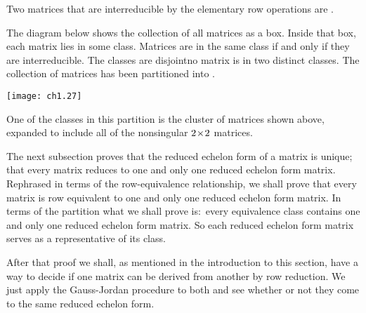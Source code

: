 \begin{definition}
Two matrices that are interreducible by the elementary row operations
are .%
\end{definition}

The diagram below shows the collection of all matrices as a box.
Inside that box, each matrix lies in some class.
Matrices are in the same class if and only if they are interreducible.
The classes are disjoint\Dash no matrix is in two distinct classes.
The collection of matrices has been partitioned into 
.

\begin{center}
  \texttt{[image: ch1.27]}
\end{center}
\noindent One of the classes in this partition is the
cluster of matrices shown above,
expanded to include all of the nonsingular $2 \! \times \! 2$ matrices. 

The next subsection proves that the reduced echelon form of a matrix is 
unique; that 
every matrix reduces to one and only one reduced echelon form matrix.
Rephrased in terms of the row-equivalence relationship, 
we shall prove that every matrix is 
row equivalent to one and only one reduced echelon form matrix.
In terms of the partition what we shall prove is:~every
equivalence class contains one and only one reduced echelon form matrix.
So each reduced echelon form matrix serves as a representative of its 
class.

After that proof we shall, 
as mentioned in the introduction to this section, have a
way to decide if one matrix can be derived from another by row reduction.
We just apply the Gauss-Jordan procedure to both and see whether
or not they come to the same reduced echelon form.

